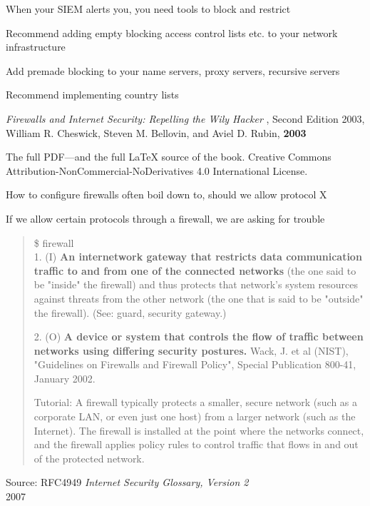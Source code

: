 \documentclass[Screen16to9,17pt]{foils}
\begin{document}


\begin{list2}
\item When your SIEM alerts you, you need tools to block and restrict
\item Recommend adding empty blocking access control lists etc. to your network infrastructure
\item Add premade blocking to your name servers, proxy servers, recursive servers
\item Recommend implementing country lists
\end{list2}



\begin{list2}
\item \emph{Firewalls and Internet Security: Repelling the Wily Hacker} , Second Edition 2003, William R. Cheswick, Steven M. Bellovin, and Aviel D. Rubin, {\bf 2003} 
\item The full PDF—and the full LaTeX source of the book.
Creative Commons Attribution-NonCommercial-NoDerivatives 4.0 International License.
\item How to configure firewalls often boil down to, should we allow protocol X
\item If we allow certain protocols through a firewall, we are asking for trouble
\end{list2}



\begin{quote}\small
\$ firewall\\

1. (I) {\bf An internetwork gateway that restricts data communication traffic to and from one of the connected networks} (the one said to be "inside" the firewall) and thus protects that network's system resources against threats from the other network (the one that is said to be "outside" the firewall). (See: guard, security gateway.)

2. (O) {\bf A device or system that controls the flow of traffic between networks using differing security postures.} Wack, J. et al (NIST), "Guidelines on Firewalls and Firewall Policy", Special Publication 800-41, January 2002.

Tutorial: A firewall typically protects a smaller, secure network (such as a corporate LAN, or even just one host) from a larger network (such as the Internet). The firewall is installed at the point where the networks connect, and the firewall applies policy rules to control traffic that flows in and out of the protected network.
\end{quote}
{\footnotesize Source: RFC4949 \emph{Internet Security Glossary, Version 2}\\
 2007}
\end{document}
